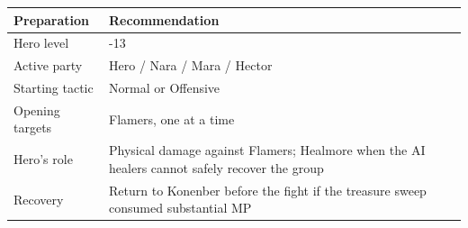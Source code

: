 \documentclass[
  american,
  10pt,
  letterpaper,
  oneside,
  open=any]{scrreprt}
\newcounter{none} %
\newenvironment{guidetable}{%
  \small\setstretch{1.0}%
  \setlength{\tabcolsep}{4pt}%
  \setlength{\LTpre}{8pt}\setlength{\LTpost}{10pt}%
  \renewcommand{\arraystretch}{1.16}%
}{ }
\begin{document}
\begin{guidetable}

{\def\LTcaptype{none} %
\begin{longtable}[]{@{}
  >{\raggedright\arraybackslash}p{}
  >{\raggedright\arraybackslash}p{}@{}}
\toprule\noalign{}
\begin{minipage}[b]{\linewidth}\raggedright
\color{GuideGreen}\bfseries Preparation
\end{minipage} & \begin{minipage}[b]{\linewidth}\raggedright
\color{GuideGreen}\bfseries Recommendation
\end{minipage} \\
\midrule\noalign{}
\endhead
\bottomrule\noalign{}
\endlastfoot
Hero level & 12-13 \\
Active party & Hero / Nara / Mara / Hector \\
Starting tactic & Normal or Offensive \\
Opening targets & Flamers, one at a time \\
Hero's role & Physical damage against Flamers; Healmore when the AI
healers cannot safely recover the group \\
Recovery & Return to Konenber before the fight if the treasure sweep
consumed substantial MP \\
\end{longtable}
}

\end{guidetable}
\end{document}
